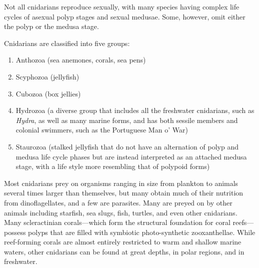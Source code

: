 \documentclass[]{book}
\providecommand{\tightlist}{%
  \setlength{\itemsep}{0pt}\setlength{\parskip}{0pt}}
\theoremstyle{definition}
\theoremstyle{definition}
\theoremstyle{definition}
\theoremstyle{remark}
\begin{document}
Not all cnidarians reproduce sexually, with many species having complex
life cycles of asexual polyp stages and sexual medusae. Some, however,
omit either the polyp or the medusa stage.

Cnidarians are classified into five groups:

\begin{enumerate}
\def\labelenumi{\arabic{enumi}.}
\tightlist
\item
  Anthozoa (sea anemones, corals, sea pens)
\item
  Scyphozoa (jellyfish)
\item
  Cubozoa (box jellies)
\item
  Hydrozoa (a diverse group that includes all the freshwater
  cnidarians, such as \emph{Hydra}, as well as many marine forms, and
  has both sessile members and colonial swimmers, such as the Portuguese
  Man o' War)
\item
  Staurozoa (stalked jellyfish that do not have an alternation of
  polyp and medusa life cycle phases but are instead interpreted as an
  attached medusa stage, with a life style more resembling that of
  polypoid forms)
\end{enumerate}

Most cnidarians prey on organisms ranging in size from plankton to
animals several times larger than themselves, but many obtain much of
their nutrition from dinoflagellates, and a few are parasites. Many are
preyed on by other animals including starfish, sea slugs, fish, turtles,
and even other cnidarians. Many scleractinian corals---which form the
structural foundation for coral reefs---possess polyps that are filled
with symbiotic photo-synthetic zooxanthellae. While reef-forming corals
are almost entirely restricted to warm and shallow marine waters, other
cnidarians can be found at great depths, in polar regions, and in
freshwater.
\end{document}
